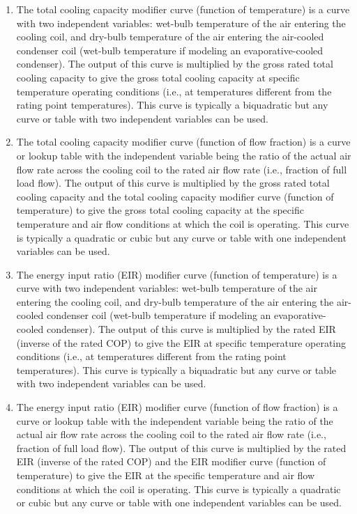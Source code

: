 \begin{enumerate}
\def\labelenumi{\arabic{enumi}.}
\item
  The total cooling capacity modifier curve (function of temperature) is a curve with two independent variables: wet-bulb temperature of the air entering the cooling coil, and dry-bulb temperature of the air entering the air-cooled condenser coil (wet-bulb temperature if modeling an evaporative-cooled condenser). The output of this curve is multiplied by the gross rated total cooling capacity to give the gross total cooling capacity at specific temperature operating conditions (i.e., at temperatures different from the rating point temperatures). This curve is typically a biquadratic but any curve or table with two independent variables can be used.
\item
  The total cooling capacity modifier curve (function of flow fraction) is a curve or lookup table with the independent variable being the ratio of the actual air flow rate across the cooling coil to the rated air flow rate (i.e., fraction of full load flow). The output of this curve is multiplied by the gross rated total cooling capacity and the total cooling capacity modifier curve (function of temperature) to give the gross total cooling capacity at the specific temperature and air flow conditions at which the coil is operating. This curve is typically a quadratic or cubic but any curve or table with one independent variables can be used.
\item
  The energy input ratio (EIR) modifier curve (function of temperature) is a curve with two independent variables: wet-bulb temperature of the air entering the cooling coil, and dry-bulb temperature of the air entering the air-cooled condenser coil (wet-bulb temperature if modeling an evaporative-cooled condenser). The output of this curve is multiplied by the rated EIR (inverse of the rated COP) to give the EIR at specific temperature operating conditions (i.e., at temperatures different from the rating point temperatures). This curve is typically a biquadratic but any curve or table with two independent variables can be used.
\item
  The energy input ratio (EIR) modifier curve (function of flow fraction) is a curve or lookup table with the independent variable being the ratio of the actual air flow rate across the cooling coil to the rated air flow rate (i.e., fraction of full load flow). The output of this curve is multiplied by the rated EIR (inverse of the rated COP) and the EIR modifier curve (function of temperature) to give the EIR at the specific temperature and air flow conditions at which the coil is operating. This curve is typically a quadratic or cubic but any curve or table with one independent variables can be used.

\end{enumerate}
